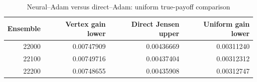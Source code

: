 \begin{table}[htbp]
\caption{Neural--Adam versus direct--Adam: uniform true-payoff comparison}\label{tab:r22conditional}
\begin{tabular}{rrrr}
\toprule
Ensemble & Vertex gain lower & Direct Jensen upper & Uniform gain lower\\\midrule
22000 & 0.00747909 & 0.00436669 & 0.00311240\\
22100 & 0.00749716 & 0.00437404 & 0.00312312\\
22200 & 0.00748655 & 0.00435908 & 0.00312747\\
\bottomrule\end{tabular}
\end{table}
